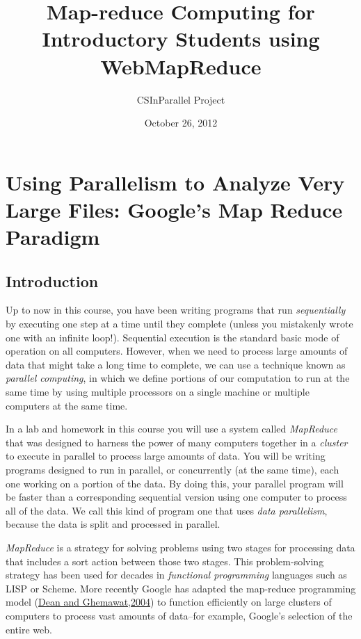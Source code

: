 \documentclass[letterpaper,10pt,openany,oneside]{sphinxmanual}
\title{Map-reduce Computing for Introductory Students using WebMapReduce}
\date{October 26, 2012}
\author{CSInParallel Project}
\begin{document}
\maketitle
\tableofcontents
{}\label{index::doc}



\chapter{Using Parallelism to Analyze Very Large Files: Google's Map Reduce Paradigm}
\label{MapReduceIntro/MapReduceIntro:map-reduce-computing-for-introductory-students-using-webmapreduce}\label{MapReduceIntro/MapReduceIntro::doc}\label{MapReduceIntro/MapReduceIntro:using-parallelism-to-analyze-very-large-files-google-s-map-reduce-paradigm}

\section{Introduction}
\label{MapReduceIntro/MapReduceIntro:introduction}
Up to now in this course, you have been writing programs that run
\emph{sequentially} by executing one step at a time until they complete
(unless you mistakenly wrote one with an infinite loop!).
Sequential execution is the standard basic mode of operation on all
computers. However, when we need to process large amounts of data
that might take a long time to complete, we can use a technique
known as \emph{parallel computing}, in which we define portions of our
computation to run at the same time by using multiple processors on
a single machine or multiple computers at the same time.

In a lab and homework in this course you will use a system called
\emph{MapReduce} that was designed to harness the power of many
computers together in a \emph{cluster} to execute in parallel to process
large amounts of data. You will be writing programs designed to run
in parallel, or concurrently (at the same time), each one working
on a portion of the data. By doing this, your parallel program will
be faster than a corresponding sequential version using one
computer to process all of the data. We call this kind of program
one that uses \emph{data parallelism}, because the data is split and
processed in parallel.

\emph{MapReduce} is a strategy for solving problems using two stages for
processing data that includes a sort action between those two
stages. This problem-solving strategy has been used for decades in
\emph{functional programming} languages such as LISP or Scheme. More
recently Google has adapted the map-reduce programming model
(\href{http://labs.google.com/papers/mapreduce.html}{Dean and Ghemawat,2004})
to function efficiently on large clusters of computers to process
vast amounts of data--for example, Google's selection of the entire
web.
\end{document}
